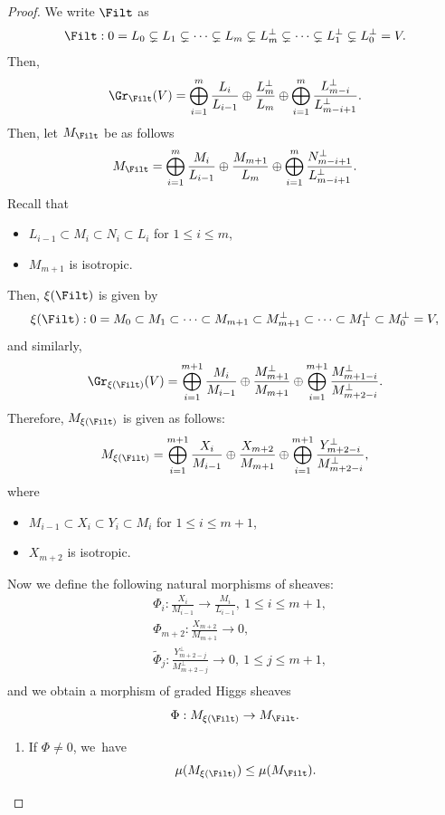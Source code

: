 \begin{proof}
We write $\Filt$ as
\[
\Filt: 0= L_0 \subsetneq L_1 \subsetneq \cdots \subsetneq L_m \subsetneq L_m^\perp\subsetneq\cdots \subsetneq L_1^\perp\subsetneq L_0^\perp= V.
\]
Then,
\[
\Gr_{\Filt}(V)=\mathop{\bigoplus}_{i=1}^{m} \frac{L_i}{L_{i-1}}\oplus \frac{L_m^\perp}{L_m}\oplus \mathop{\bigoplus}_{i=1}^{m} \frac{L_{m-i}^\perp}{L_{m-i+1}^\perp}.
\]
Then, let $M_{\Filt}$ be as follows
\[
M_{\Filt}=\mathop{\bigoplus}_{i=1}^{m} \frac{M_i}{L_{i-1}}\oplus \frac{M_{m+1}}{L_m}\oplus \mathop{\bigoplus}_{i=1}^{m} \frac{N_{m-i+1}^\perp}{L_{m-i+1}^\perp}.
\]
Recall that
\begin{itemize}
\item $L_{i-1} \subset M_i \subset N_i \subset L_i$ for $1 \leq i \leq m$,
\item $M_{m+1}$ is isotropic.
\end{itemize}
Then, $\xi(\Filt)$ is given by
\[
\xi(\Filt):0=M_0\subset M_1\subset\cdots\subset M_{m+1}\subset M_{m+1}^\perp\subset\cdots\subset M_1^\perp\subset M_0^\perp=V,
\]
and similarly,
\[
\Gr_{\xi(\Filt)}(V)=\mathop{\bigoplus}_{i=1}^{m+1} \frac{M_i}{M_{i-1}}\oplus \frac{M_{m+1}^\perp}{M_{m+1}}\oplus \mathop{\bigoplus}_{i=1}^{m+1} \frac{M_{m+1-i}^\perp}{M_{m+2-i}^\perp}.
\]
Therefore, $M_{\xi(\Filt)}$ is given as follows:
\[
M_{\xi(\Filt)}=\mathop{\bigoplus}_{i=1}^{m+1} \frac{X_i}{M_{i-1}}\oplus \frac{X_{m+2}}{M_{m+1}}\oplus \mathop{\bigoplus}_{i=1}^{m+1} \frac{Y_{m+2-i}^\perp}{M_{m+2-i}^\perp},
\]
where
\begin{itemize}
\item $M_{i-1} \subset X_i \subset Y_i \subset M_i$ for $1 \leq i \leq m+1$,
\item $X_{m+2}$ is isotropic.
\end{itemize}

Now we define the following natural morphisms of sheaves:
\begin{equation}
\begin{split}
&\Phi_i:\frac{X_i}{M_{i-1}}\to \frac{M_i}{L_{i-1}},\ 1\leq i\leq m+1,\\
&\Phi_{m+2}:\frac{X_{m+2}}{M_{m+1}}\to 0,\\&\tilde{\Phi}_j:\frac{Y_{m+2-j}^\perp}{M_{m+2-j}^\perp}\to 0,\ 1\leq j\leq m+1,\\
\end{split}
\end{equation}
and we obtain a morphism of graded Higgs sheaves
\[
\Phi: M_{\xi(\Filt)}\to M_{\Filt}.
\]
\begin{enumerate}
\item If $\Phi\neq 0$, we~have
\[
\mu(M_{\xi(\Filt)})\leq \mu(M_{\Filt}).
\]


\end{enumerate}
\end{proof}

